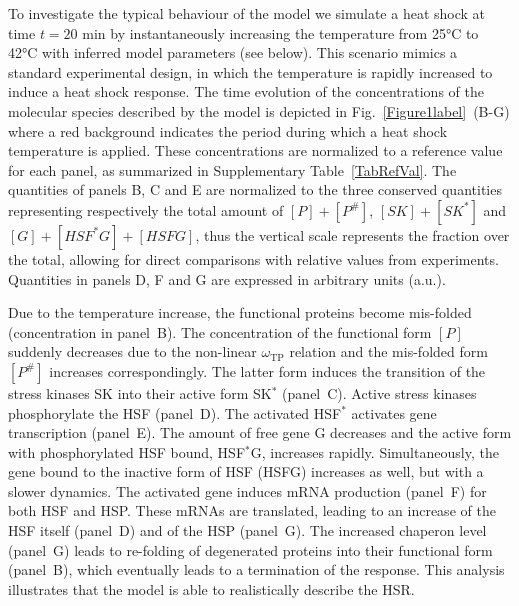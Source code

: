 \documentclass[oneside, 10pt, a4paper, twocolumn]{article}
\begin{document}
To investigate the typical behaviour of the model we simulate a heat
shock at time $t=20$ min by instantaneously increasing the temperature from 25°C to
42°C with inferred model parameters (see below). This scenario mimics a standard experimental design, in which the temperature
is rapidly increased to induce a heat shock response. 
The time evolution of the concentrations of the molecular species
described by the model is depicted in Fig.~\ref{Figure1label}~(B-G) where a red background indicates the period during which a heat shock temperature is applied. 
These concentrations are normalized to a reference value for each panel, as summarized in Supplementary Table~\ref{TabRefVal}. The quantities of panels B, C and E are normalized to the three conserved quantities representing respectively the total amount of $\left[P\right] + \left[P^\#\right]$, $\left[SK\right]+\left[SK^*\right]$ and $\left[G\right] +\left[HSF^*G\right] +\left[HSFG\right]$, thus the vertical scale represents the fraction over the total, allowing for direct comparisons with relative values from experiments. Quantities in panels D, F and G are expressed in arbitrary units (a.u.). 

Due to the temperature increase, the
functional proteins become mis-folded (concentration in panel~B). 
The concentration of the functional form $\left[P\right]$ suddenly decreases due to the non-linear $\omega_\textrm{TP}$ relation and the mis-folded form
$\left[P^\#\right]$ increases correspondingly. The latter form induces the
transition of the stress kinases SK into their active form SK$^*$ (panel~C). Active stress kinases
phosphorylate the HSF (panel~D). The activated HSF$^*$ activates gene transcription (panel~E). The amount of free gene G decreases and the active form with
phosphorylated HSF bound, HSF$^*$G, increases rapidly. Simultaneously,
the gene bound to the inactive form of HSF (HSFG) increases as well,
but with a slower dynamics. The activated gene induces mRNA production (panel~F) for both HSF and HSP. These mRNAs are translated, leading to an increase of the HSF itself (panel~D) and of the HSP (panel~G). The
increased chaperon level (panel~G) leads to re-folding of
degenerated proteins into their functional form (panel~B),
which eventually leads to a termination of the response. This analysis illustrates
that the model is able to realistically describe the HSR.
\end{document}
